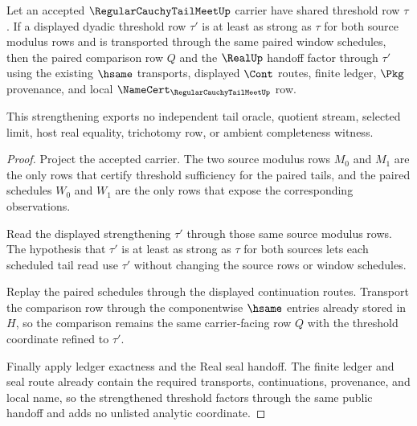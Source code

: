 \begin{theorem}
\label{thm:regular-cauchy-tail-meet-shared-threshold-cofinality}
Let an accepted $\RegularCauchyTailMeetUp$ carrier have shared threshold row $\tau$. If a displayed dyadic threshold row $\tau'$ is at least as strong as $\tau$ for both source modulus rows and is transported through the same paired window schedules, then the paired comparison row $Q$ and the $\RealUp$ handoff factor through $\tau'$ using the existing $\hsame$ transports, displayed $\Cont$ routes, finite ledger, $\Pkg$ provenance, and local $\NameCert_{\RegularCauchyTailMeetUp}$ row.

This strengthening exports no independent tail oracle, quotient stream, selected limit, host real equality, trichotomy row, or ambient completeness witness.
\end{theorem}
\begin{proof}
Project the accepted carrier. The two source modulus rows $M_0$ and $M_1$ are the only rows that certify threshold sufficiency for the paired tails, and the paired schedules $W_0$ and $W_1$ are the only rows that expose the corresponding observations.

Read the displayed strengthening $\tau'$ through those same source modulus rows. The hypothesis that $\tau'$ is at least as strong as $\tau$ for both sources lets each scheduled tail read use $\tau'$ without changing the source rows or window schedules.

Replay the paired schedules through the displayed continuation routes. Transport the comparison row through the componentwise $\hsame$ entries already stored in $H$, so the comparison remains the same carrier-facing row $Q$ with the threshold coordinate refined to $\tau'$.

Finally apply ledger exactness and the Real seal handoff. The finite ledger and seal route already contain the required transports, continuations, provenance, and local name, so the strengthened threshold factors through the same public handoff and adds no unlisted analytic coordinate.
\end{proof}

